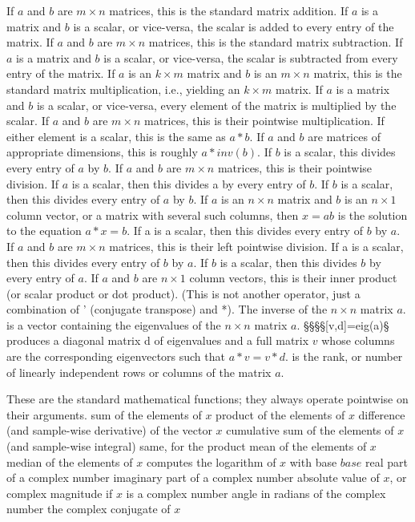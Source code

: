 	{If $a$ and $b$ are $m \times n$ matrices, this is the standard matrix addition. If $a$ is a matrix and $b$ is a scalar, or vice-versa, the scalar is added to every entry of the matrix.}
	{If $a$ and $b$ are $m \times n$ matrices, this is the standard matrix subtraction. If $a$ is a matrix and $b$ is a scalar, or vice-versa, the scalar is subtracted from every entry of the matrix.}
	{If $a$ is an $k \times m$ matrix and $b$ is an $m \times n$ matrix, this is the standard matrix multiplication, i.e., yielding an $k \times m$ matrix. If $a$ is a matrix and $b$ is a scalar, or vice-versa, every element of the matrix is multiplied by the scalar.}
	{If $a$ and $b$ are $m \times n$ matrices, this is their pointwise multiplication. If either element is a scalar, this is the same as $a*b$.}
	{If $a$ and $b$ are matrices of appropriate dimensions, this is roughly $a*inv(b).$ If $b$ is a scalar, this divides every entry of $a$ by $b$.}
	{If $a$ and $b$ are $m \times n$ matrices, this is their
pointwise division. If $a$ is a scalar, then this divides a by every entry of
$b$. If $b$ is a scalar, then this divides every entry of $a$ by $b$. }
	{If $a$ is an $n \times n$ matrix and $b$ is an $n \times
1$ column vector, or a matrix with several such columns, then $x=a$\bs$b$ is the
solution to the equation $a*x=b$. If a is a scalar, then this divides every
entry of $b$ by $a$.}
	{If $a$ and $b$ are $m \times n$ matrices, this is their
left pointwise division. If a is a scalar, then this divides every entry of $b$
by $a$. If $b$ is a scalar, then this divides $b$ by every entry of $a$.}
	{If $a$ and $b$ are $n \times 1$ column vectors, this is their inner product (or scalar product or dot product). (This is not another operator, just a combination of ' (conjugate transpose) and *).}
	{The inverse of the $n \times n$ matrix $a$.}
	{is a vector containing the eigenvalues of the $n \times n$ matrix $a$.}
§§§§[v,d]=eig(a)§ produces a diagonal matrix d of eigenvalues and a full matrix $v$ whose columns are the corresponding eigenvectors such that $a*v=v*d$.
	{is the rank, or number of linearly independent rows or columns of the matrix $a$.}

	{These are the standard mathematical functions; they always operate pointwise on their arguments.}
	{sum of the elements of $x$}
	{product of the elements of $x$}
	{difference (and sample-wise derivative) of the vector $x$}
	{cumulative sum of the elements of $x$ (and sample-wise integral)}
	{same, for the product}
	{mean of the elements of $x$}
	{median of the elements of $x$}
	{computes the logarithm of $x$ with base $base$}
	{real part of a complex number}
	{imaginary part of a complex number}
	{absolute value of $x$, or complex magnitude if $x$ is a complex number}
	{angle in radians of the complex number}
	{the complex conjugate of $x$}

